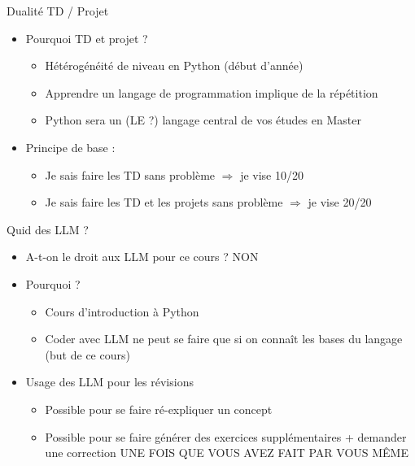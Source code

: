 \documentclass[10pt]{beamer}
\begin{document}
\begin{frame}{Dualité TD / Projet}  
  \begin{itemize}
    \item Pourquoi TD \alert{et} projet ?
    \begin{itemize}
      \item Hétérogénéité de niveau en Python (début d'année)
      \item Apprendre un langage de programmation implique de la répétition
      \item Python sera un (LE ?) langage central de vos études en Master
    \end{itemize}
    \item Principe de base :
    \begin{itemize}
        \item Je sais faire les TD sans problème $\Rightarrow$ je vise 10/20
        \item Je sais faire les TD et les projets sans problème $\Rightarrow$ je vise 20/20
    \end{itemize}  
  \end{itemize}
\end{frame}

\begin{frame}{Quid des LLM ?}  
  \begin{itemize}
    \item A-t-on le droit aux LLM pour ce cours ? \alert{NON}
    \item Pourquoi ?
    \begin{itemize}
      \item Cours d'introduction à Python
      \item Coder avec LLM ne peut se faire que si on connaît les bases du langage (but de ce cours)
    \end{itemize}  
    \item Usage des LLM pour les révisions
    \begin{itemize}
      \item Possible pour se faire ré-expliquer un concept
      \item Possible pour se faire générer des exercices supplémentaires + demander une correction \alert{UNE FOIS QUE VOUS AVEZ FAIT PAR VOUS MÊME}
    \end{itemize}  
  \end{itemize}
\end{frame}
\end{document}
